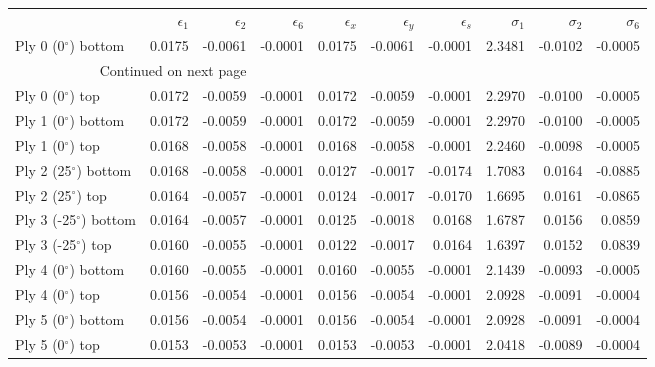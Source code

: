 \begin{longtable}{lrrrrrrrrr}
\toprule
{} &  $\epsilon_1$ &  $\epsilon_2$ &  $\epsilon_6$ &  $\epsilon_x$ &  $\epsilon_y$ &  $\epsilon_s$ &  $\sigma_1$ &  $\sigma_2$ &  $\sigma_6$ \\
Ply 0 (0$^\circ$)   bottom &        0.0175 &       -0.0061 &       -0.0001 &        0.0175 &       -0.0061 &       -0.0001 &      2.3481 &     -0.0102 &     -0.0005 \\
\midrule
\endhead
\midrule
\multicolumn{3}{r}{{Continued on next page}} \\
\midrule
\endfoot
\bottomrule
\endlastfoot
Ply 0 (0$^\circ$)   top    &        0.0172 &       -0.0059 &       -0.0001 &        0.0172 &       -0.0059 &       -0.0001 &      2.2970 &     -0.0100 &     -0.0005 \\
Ply 1 (0$^\circ$)   bottom &        0.0172 &       -0.0059 &       -0.0001 &        0.0172 &       -0.0059 &       -0.0001 &      2.2970 &     -0.0100 &     -0.0005 \\
Ply 1 (0$^\circ$)   top    &        0.0168 &       -0.0058 &       -0.0001 &        0.0168 &       -0.0058 &       -0.0001 &      2.2460 &     -0.0098 &     -0.0005 \\
Ply 2 (25$^\circ$)  bottom &        0.0168 &       -0.0058 &       -0.0001 &        0.0127 &       -0.0017 &       -0.0174 &      1.7083 &      0.0164 &     -0.0885 \\
Ply 2 (25$^\circ$)  top    &        0.0164 &       -0.0057 &       -0.0001 &        0.0124 &       -0.0017 &       -0.0170 &      1.6695 &      0.0161 &     -0.0865 \\
Ply 3 (-25$^\circ$) bottom &        0.0164 &       -0.0057 &       -0.0001 &        0.0125 &       -0.0018 &        0.0168 &      1.6787 &      0.0156 &      0.0859 \\
Ply 3 (-25$^\circ$) top    &        0.0160 &       -0.0055 &       -0.0001 &        0.0122 &       -0.0017 &        0.0164 &      1.6397 &      0.0152 &      0.0839 \\
Ply 4 (0$^\circ$)   bottom &        0.0160 &       -0.0055 &       -0.0001 &        0.0160 &       -0.0055 &       -0.0001 &      2.1439 &     -0.0093 &     -0.0005 \\
Ply 4 (0$^\circ$)   top    &        0.0156 &       -0.0054 &       -0.0001 &        0.0156 &       -0.0054 &       -0.0001 &      2.0928 &     -0.0091 &     -0.0004 \\
Ply 5 (0$^\circ$)   bottom &        0.0156 &       -0.0054 &       -0.0001 &        0.0156 &       -0.0054 &       -0.0001 &      2.0928 &     -0.0091 &     -0.0004 \\
Ply 5 (0$^\circ$)   top    &        0.0153 &       -0.0053 &       -0.0001 &        0.0153 &       -0.0053 &       -0.0001 &      2.0418 &     -0.0089 &     -0.0004 \\
\end{longtable}